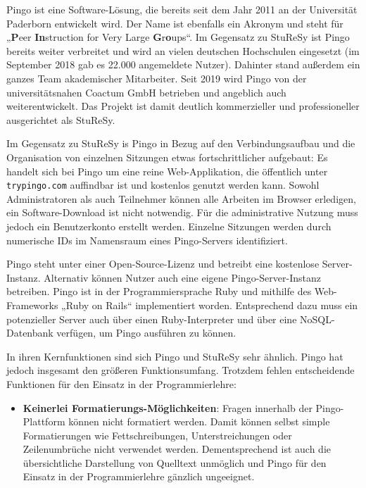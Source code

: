 Pingo ist eine Software-Lösung, die bereits seit dem Jahr 2011 an der Universität Paderborn entwickelt wird. Der Name ist ebenfalls ein Akronym und steht für „\textbf{P}eer \textbf{In}struction for Very Large \textbf{G}r\textbf{o}ups“. Im Gegensatz zu StuReSy ist Pingo bereits weiter verbreitet und wird an vielen deutschen Hochschulen eingesetzt (im September 2018 gab es 22.000 angemeldete Nutzer). Dahinter stand außerdem ein ganzes Team akademischer Mitarbeiter. Seit 2019 wird Pingo von der universitätsnahen Coactum GmbH betrieben und angeblich auch weiterentwickelt. Das Projekt ist damit deutlich kommerzieller und professioneller ausgerichtet als StuReSy.

Im Gegensatz zu StuReSy is Pingo in Bezug auf den Verbindungsaufbau und die Organisation von einzelnen Sitzungen etwas fortschrittlicher aufgebaut: Es handelt sich bei Pingo um eine reine Web-Applikation, die öffentlich unter \texttt{trypingo.com} auffindbar ist und kostenlos genutzt werden kann. Sowohl Administratoren als auch Teilnehmer können alle Arbeiten im Browser erledigen, ein Software-Download ist nicht notwendig. Für die administrative Nutzung muss jedoch ein Benutzerkonto erstellt werden. Einzelne Sitzungen werden durch numerische IDs im Namensraum eines Pingo-Servers identifiziert.


Pingo steht unter einer Open-Source-Lizenz und betreibt eine kostenlose Server-Instanz. Alternativ können Nutzer auch eine eigene Pingo-Server-Instanz betreiben. Pingo ist in der Programmiersprache Ruby und mithilfe des Web-Frameworks „Ruby on Rails“ implementiert worden. Entsprechend dazu muss ein potenzieller Server auch über einen Ruby-Interpreter und über eine NoSQL-Datenbank verfügen, um Pingo ausführen zu können.

In ihren Kernfunktionen sind sich Pingo und StuReSy sehr ähnlich. Pingo hat jedoch insgesamt den größeren Funktionsumfang. Trotzdem fehlen entscheidende Funktionen für den Einsatz in der Programmierlehre:
\begin{itemize}
    \item \textbf{Keinerlei Formatierungs-Möglichkeiten}: Fragen innerhalb der Pingo-Plattform können nicht formatiert werden. Damit können selbst simple Formatierungen wie Fettschreibungen, Unterstreichungen oder Zeilenumbrüche nicht verwendet werden. Dementsprechend ist auch die übersichtliche Darstellung von Quelltext unmöglich und Pingo für den Einsatz in der Programmierlehre gänzlich ungeeignet.
\end{itemize}

